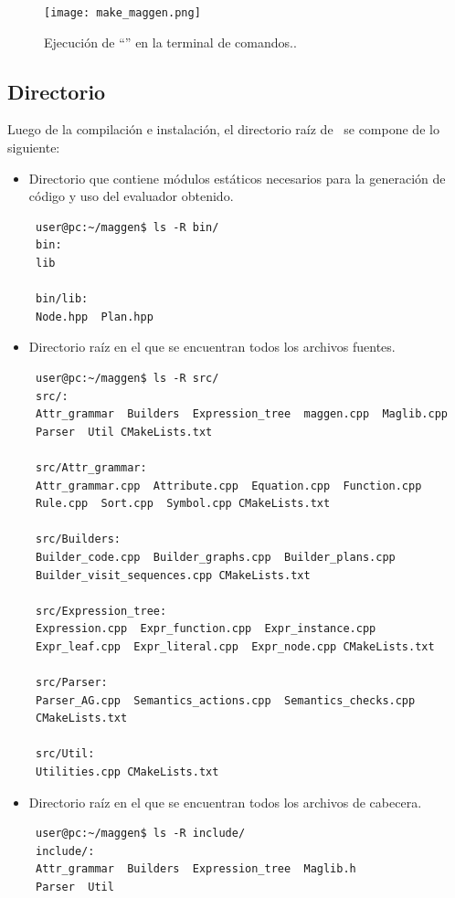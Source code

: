 \begin{figure}[!ht]\centering
\texttt{[image: make\_maggen.png]}
\caption{\label{fig:make_maggen} Ejecución de ``'' en la terminal de comandos..}
\end{figure}
 
\subsection{Directorio }
Luego de la compilación e instalación, el directorio raíz de \maggen\ se compone de lo siguiente:
\begin{itemize}
\item {} Directorio que contiene módulos estáticos necesarios para la generación de código y uso del evaluador obtenido.
{\footnotesize \begin{verbatim}
 user@pc:~/maggen$ ls -R bin/
 bin:
 lib

 bin/lib:
 Node.hpp  Plan.hpp
\end{verbatim} }
 
\item {} Directorio raíz en el que se encuentran todos los archivos fuentes.
{\footnotesize \begin{verbatim}
 user@pc:~/maggen$ ls -R src/ 
 src/:
 Attr_grammar  Builders  Expression_tree  maggen.cpp  Maglib.cpp  
 Parser  Util CMakeLists.txt

 src/Attr_grammar:
 Attr_grammar.cpp  Attribute.cpp  Equation.cpp  Function.cpp  
 Rule.cpp  Sort.cpp  Symbol.cpp CMakeLists.txt

 src/Builders:
 Builder_code.cpp  Builder_graphs.cpp  Builder_plans.cpp  
 Builder_visit_sequences.cpp CMakeLists.txt

 src/Expression_tree:
 Expression.cpp  Expr_function.cpp  Expr_instance.cpp  
 Expr_leaf.cpp  Expr_literal.cpp  Expr_node.cpp CMakeLists.txt

 src/Parser:
 Parser_AG.cpp  Semantics_actions.cpp  Semantics_checks.cpp
 CMakeLists.txt

 src/Util:
 Utilities.cpp CMakeLists.txt
\end{verbatim} }

\item {} Directorio raíz en el que se encuentran todos los archivos de cabecera.

{\footnotesize \begin{verbatim}
 user@pc:~/maggen$ ls -R include/
 include/:
 Attr_grammar  Builders  Expression_tree  Maglib.h  
 Parser  Util


\end{verbatim}}
\end{itemize}

